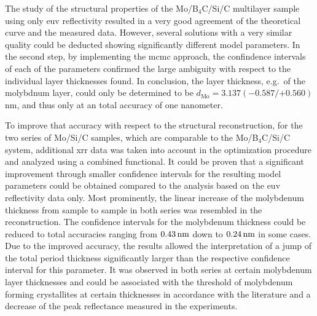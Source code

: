 The study of the structural properties of the Mo/B$_4$C/Si/C multilayer sample using only \gls{euv} reflectivity resulted in a very good agreement of the theoretical curve and the measured data. However, several solutions with a very similar quality could be deducted showing significantly different model parameters. In the second step, by implementing the \gls{mcmc} approach, the confindence intervals of each of the parameters confirmed the large ambiguity with respect to the individual layer thicknesses found. In conclusion, the layer thickness, e.g.~of the molybdnum layer, could only be determined to be $d_\text{Mo} = 3.137 ({-0.587}/{+0.560})$ nm, and thus only at an total accuracy of one nanometer.

To improve that accuracy with respect to the structural reconstruction, for the two series of Mo/Si/C samples, which are comparable to the Mo/B$_4$C/Si/C system, additional \gls{xrr} data was taken into account in the optimization procedure and analyzed using a combined functional. It could be proven that a significant improvement through smaller confidence intervals for the resulting model parameters could be obtained compared to the analysis based on the \gls{euv} reflectivity data only. Most prominently, the linear increase of the molybdenum thickness from sample to sample in both series was resembled in the reconstruction. The confidence intervals for the molybdenum thickness could be reduced to total accuracies ranging from $\nm{0.43}$ down to $\nm{0.24}$ in some cases. Due to the improved accuracy, the results allowed the interpretation of a jump of the total period thickness significantly larger than the respective confidence interval for this parameter. It was observed in both series at certain molybdenum layer thicknesses and could be associated with the threshold of molybdenum forming crystallites at certain thicknesses in accordance with the literature and a decrease of the peak reflectance measured in the experiments.

